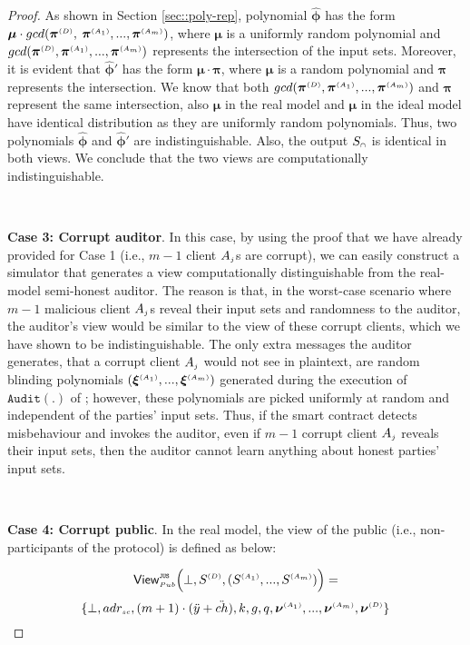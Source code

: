 \begin{proof}
 
 As shown in Section \ref{sec::poly-rep},  polynomial $\bm{\hat\phi}$ has the form $\bm\mu\cdot gcd( \bm\pi^{ \scriptscriptstyle {  {(D)}} },$ $\bm\pi^{\scriptscriptstyle (A_1)}, ..., \bm\pi^{\scriptscriptstyle (A_m)})$, where $\bm\mu$ is a uniformly random polynomial and $gcd( \bm\pi^{ \scriptscriptstyle {  {(D)}} },\bm\pi^{\scriptscriptstyle (A_1)}, ..., \bm\pi^{\scriptscriptstyle (A_m)})$ represents the intersection of the input sets. Moreover, it is evident that $\bm{\hat\phi}'$ has the form $ {\bm\mu} \cdot  {\bm\pi}$, where $ {\bm\mu} $ is a random polynomial and $ {\bm\pi}$ represents the intersection. We know that both $gcd( \bm\pi^{ \scriptscriptstyle {  {(D)}} },\bm\pi^{\scriptscriptstyle (A_1)}, ..., \bm\pi^{\scriptscriptstyle (A_m)})$ and $ {\bm\pi}$  represent the same intersection, also  ${\bm\mu} $ in the real model and $ {\bm\mu} $ in the ideal model have identical distribution as they are uniformly random polynomials. Thus, two polynomials $\bm{\hat\phi}$ and $\bm{\hat\phi}'$ are indistinguishable. Also, the output $S_{\scriptscriptstyle \cap}$ is identical in both views. We conclude that the two views are computationally indistinguishable.
 
 
 \

\noindent\textbf{Case 3: Corrupt auditor}.  In this case, by using the proof that we have already provided for Case 1 (i.e.,  $m-1$ client $A_{\scriptscriptstyle j}$s are corrupt), we can easily construct a simulator that generates a view computationally distinguishable from the real-model semi-honest auditor. 
 The reason is that, in the worst-case scenario where $m-1$ malicious client $A_{\scriptscriptstyle j}$s reveal their input sets and randomness to the auditor, the auditor's view would be similar to the view of these corrupt clients, which we have shown to be indistinguishable. The only extra messages the auditor generates, that a corrupt client $A_{\scriptscriptstyle j}$ would not see in plaintext, are random blinding polynomials $(\bm\xi^{\scriptscriptstyle (A_1)},..., \bm\xi^{\scriptscriptstyle (A_m)})$ generated during the execution of $\mathtt{Audit}(.)$ of \zspaa; however, these polynomials are picked uniformly at random and independent of the parties' input sets. Thus, if the smart contract detects misbehaviour and invokes the auditor, even if $m-1$ corrupt client $A_{\scriptscriptstyle j}$ reveals their input sets, then the auditor cannot learn anything about honest parties' input sets.    
 
 \

\noindent\textbf{Case 4: Corrupt public}. In the real model, the view of the public (i.e., non-participants of the protocol) is defined as below: 
 

 $$ \mathsf{View}_{\scriptscriptstyle Pub}^{\scriptscriptstyle \mathtt{JUS}} \Big(\bot, S^{\scriptscriptstyle (D)},(S^{\scriptscriptstyle (A_1)},..., S^{\scriptscriptstyle (A_m)})\Big)=$$ $$ \{\bot, adr_{\scriptscriptstyle sc}, (m+1)\cdot(\ddot{y}+\ddot{ch}), k, g, q, \bm\nu^{\scriptscriptstyle (A_1)},..., \bm\nu^{\scriptscriptstyle (A_m)}, \bm\nu^{\scriptscriptstyle (D)}\}$$
 

\end{proof}
